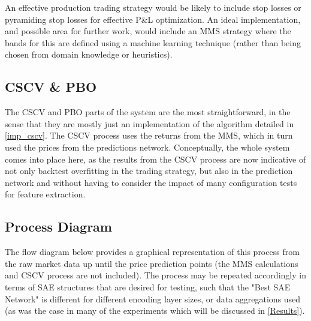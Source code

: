 \documentclass[a4paper,11pt,oneside]{article}
\theoremstyle{plain}
\theoremstyle{definition}
\begin{document}
An effective production trading strategy would be likely to include stop losses or pyramiding stop losses for effective P\&L optimization. An ideal implementation, and possible area for further work, would include an MMS strategy where the bands for this are defined using a machine learning technique (rather than being chosen from domain knowledge or heuristics).\newline


\subsection{CSCV \& PBO}\label{proc_cscv}

The CSCV and PBO parts of the system are the most straightforward, in the sense that they are mostly just an implementation of the algorithm detailed in \ref{imp_cscv}. The CSCV process uses the returns from the MMS, which in turn used the prices from the predictions network. Conceptually, the whole system comes into place here, as the results from the CSCV process are now indicative of not only backtest overfitting in the trading strategy, but also in the prediction network and without having to consider the impact of many configuration tests for feature extraction.

\subsection{Process Diagram}\label{proc_diagram}

The flow diagram below provides a graphical representation of this process from the raw market data up until the price prediction points (the MMS calculations and CSCV process are not included). The process may be repeated accordingly in terms of SAE structures that are desired for testing, such that the "Best SAE Network" is different for different encoding layer sizes, or data aggregations used (as was the case in many of the experiments which will be discussed in \ref{Results}).
\end{document}
